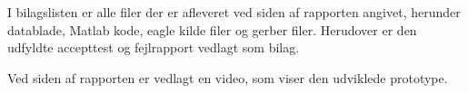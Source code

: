 I bilagslisten er alle filer der er afleveret ved siden af rapporten angivet, herunder datablade, Matlab kode, eagle kilde filer og gerber filer. Herudover er den udfyldte accepttest og fejlrapport vedlagt som bilag.

Ved siden af rapporten er vedlagt en video, som viser den udviklede prototype.

